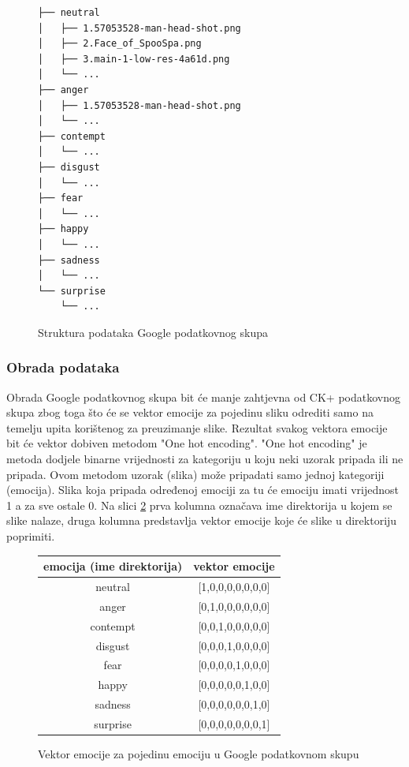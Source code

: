 \documentclass[times, utf8, zavrsni,numeric,pstricks]{fer}
\begin{document}
\begin{figure}[H]
\centering
\begin{Verbatim}[fontsize=\small]
├── neutral
│   ├── 1.57053528-man-head-shot.png
│   ├── 2.Face_of_SpooSpa.png
│   ├── 3.main-1-low-res-4a61d.png
│   └── ...
├── anger
│   ├── 1.57053528-man-head-shot.png
│   └── ...
├── contempt
│   └── ...
├── disgust
│   └── ...
├── fear
│   └── ...
├── happy
│   └── ...
├── sadness
│   └── ...
└── surprise
    └── ...
\end{Verbatim}
\caption{Struktura podataka Google podatkovnog skupa}
\label{cb:google_file_structure}
\end{figure}

\subsubsection{Obrada podataka}
Obrada Google podatkovnog skupa bit će manje zahtjevna od CK+ podatkovnog skupa zbog toga što će se vektor emocije za pojedinu sliku odrediti samo na temelju upita korištenog za preuzimanje slike. Rezultat svakog vektora emocije bit će vektor dobiven metodom "One hot encoding". "One hot encoding" je metoda dodjele binarne vrijednosti za kategoriju u koju neki uzorak pripada ili ne pripada\cite{one_hot_encoding}. Ovom metodom uzorak (slika) može pripadati samo jednoj kategoriji (emocija). Slika koja pripada određenoj emociji za tu će emociju imati vrijednost 1 a za sve ostale 0. Na slici \ref{pic:google_emotion_emo_vector} prva kolumna označava ime direktorija u kojem se slike nalaze, druga kolumna predstavlja vektor emocije koje će slike u direktoriju poprimiti.

\begin{figure}[H]
\centering
\begin{tabular}{|c|c|} 
\hline
emocija (ime direktorija) & vektor emocije \\
\hline
neutral & [1,0,0,0,0,0,0,0] \\
anger	& [0,1,0,0,0,0,0,0] \\
contempt & [0,0,1,0,0,0,0,0] \\
disgust & [0,0,0,1,0,0,0,0]\\
fear  & [0,0,0,0,1,0,0,0]\\
happy & [0,0,0,0,0,1,0,0]\\
sadness & [0,0,0,0,0,0,1,0]\\
surprise & [0,0,0,0,0,0,0,1]\\
\hline
\end{tabular}
\caption{Vektor emocije za pojedinu emociju u Google podatkovnom skupu}
\label{pic:google_emotion_emo_vector}
\end{figure}
\end{document}
